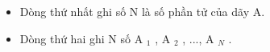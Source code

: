 \begin{itemize}
	\item     Dòng thứ nhất ghi số N là số phần tử của dãy A.   
	\item     Dòng thứ hai ghi N số A    $_     1    $    , A    $_     2    $    , ...,  A    $_     N    $    .   
\end{itemize}